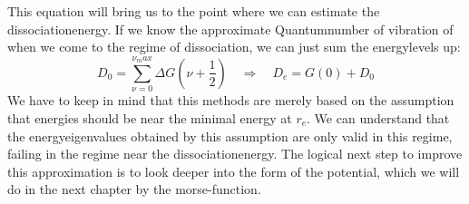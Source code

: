 This equation will bring us to the point where we can
estimate the dissociationenergy. If we know the approximate 
Quantumnumber of vibration of when we come to the regime of 
dissociation, we can just sum the energylevels up:
\begin{equation}
    D_0 = \sum_{\nu = 0 }^{\nu_max} \Delta G(\nu + \frac{1}{2})
    \quad \Rightarrow \quad D_e = G(0) + D_0
\end{equation}
We have to keep in mind that this methods are merely based on the
assumption that energies should be near the minimal energy at $r_e$.
We can understand that the energyeigenvalues obtained by this
assumption are only valid in this regime, failing in the regime
near the dissociationenergy. The logical next step to improve this 
approximation is to look deeper into the form of the potential,
which we will do in the next chapter by the morse-function.
